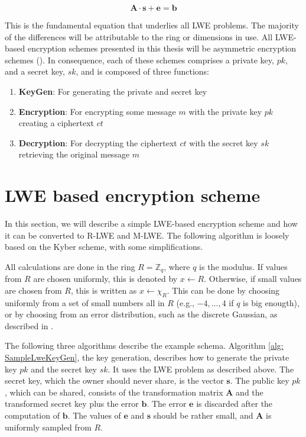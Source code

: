 $$\textbf{A}\cdot \textbf{s} + \textbf{e}= \textbf{b}$$

This is the fundamental equation that underlies all LWE problems. The majority of the differences will be attributable to the ring or dimensions in use. All LWE-based encryption schemes presented in this thesis will be asymmetric encryption schemes (\cite{Eckert2018}). In consequence, each of these schemes comprises a private key, $pk$, and a secret key, $sk$, and is composed of three functions:

\begin{enumerate}
  \item \textbf{KeyGen}: For generating the private and secret key
  \item \textbf{Encryption}: For encrypting some message $m$ with the private key $pk$ creating a ciphertext $ct$
  \item \textbf{Decryption}: For decrypting the ciphertext $ct$ with the secret key $sk$ retrieving the original message $m$
\end{enumerate}


\section{LWE based encryption scheme}
\label{sec:Lwe-Encryption}

In this section, we will describe a simple LWE-based encryption scheme and how it can be converted to R-LWE and M-LWE. The following algorithm is loosely based on the Kyber \cite{CyrstalsKyber} scheme, with some simplifications.

All calculations are done in the ring $R = \mathbb{Z}_q$, where $q$ is the modulus. If values from $R$ are chosen uniformly, this is denoted by $x \leftarrow R$. Otherwise, if small values are chosen from $R$, this is written as $x \leftarrow \chi_R$. This can be done by choosing uniformly from a set of small numbers all in $R$ (e.g., ${-4,\ldots, 4}$ if $q$ is big enougth), or by choosing from an error distribution, such as the discrete Gaussian, as described in \cite{Regev2005OnLL}.

The following three algorithms describe the example schema. Algorithm \ref{alg: SampleLweKeyGen}, the key generation, describes how to generate the private key $pk$ and the secret key $sk$. It uses the LWE problem as described above. The secret key, which the owner should never share, is the vector $\textbf{s}$. The public key $pk$, which can be shared, consists of the transformation matrix $\textbf{A}$ and the transformed secret key plus the error $\textbf{b}$. The error $\textbf{e}$ is discarded after the computation of $\textbf{b}$. The values of $\textbf{e}$ and $\textbf{s}$ should be rather small, and $\textbf{A}$ is uniformly sampled from $R$.

